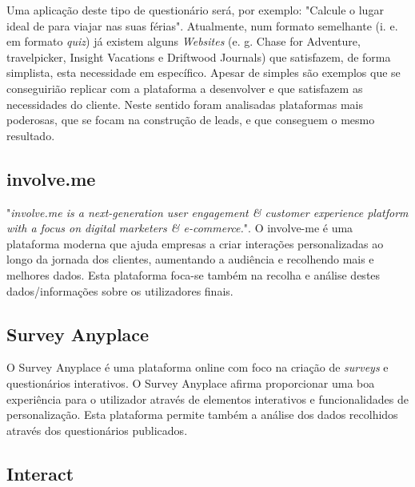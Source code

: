 Uma aplicação deste tipo de questionário será, por exemplo: "Calcule o lugar ideal de para viajar nas suas férias". Atualmente, num formato semelhante (i. e. em formato \textit{quiz}) já existem alguns \textit{Websites} (e. g. Chase for Adventure\cite{chaseforadventure}, travelpicker\cite{travelpicker}, Insight Vacations\cite{insightvacations} e Driftwood Journals\cite{driftwoodjournals}) que satisfazem, de forma simplista, esta necessidade em específico. Apesar de simples são exemplos que se conseguirião replicar com a plataforma a desenvolver e que satisfazem as necessidades do cliente. Neste sentido foram analisadas plataformas mais poderosas, que se focam na construção de leads, e que conseguem o mesmo resultado.


\subsection{involve.me}
\label{involvemeM}


"\textit{involve.me is a next-generation user engagement \& customer experience platform with a focus on digital marketers \& e-commerce.}"\cite{involve}. O involve-me é uma plataforma moderna que ajuda empresas a criar interações personalizadas ao longo da jornada dos clientes, aumentando a audiência e recolhendo mais e melhores dados. Esta plataforma foca-se também na recolha e análise destes dados/informações sobre os utilizadores finais.


\subsection{Survey Anyplace}
\label{surveyanyplaceM}




O Survey Anyplace é uma plataforma online com foco na criação de \textit{surveys} e questionários interativos. O Survey Anyplace afirma proporcionar uma boa experiência para o utilizador através de elementos interativos e funcionalidades de personalização. Esta plataforma permite também a análise dos dados recolhidos através dos questionários publicados.


\subsection{Interact}
\label{interactM}


